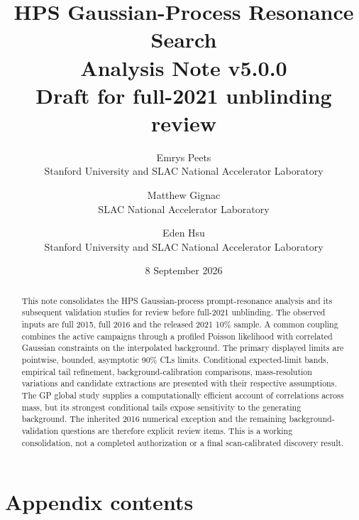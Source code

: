 \documentclass[11pt]{article}
\title{HPS Gaussian-Process Resonance Search\\[0.5em]
\large Analysis Note v5.0.0\\Draft for full-2021 unblinding review}
\author{Emrys Peets\\Stanford University and SLAC National Accelerator Laboratory
\and Matthew Gignac\\SLAC National Accelerator Laboratory
\and Eden Hsu\\Stanford University and SLAC National Accelerator Laboratory}
\date{8 September 2026}
\makeatletter
\def\CLs{CLs}%
\newcommand{\CLs}{CL$_\mathrm{s}$}
\newcommand{\startappendixcontents}{%
\let\vfiveoriginaladdcontentsline\addcontentsline
\renewcommand{\addcontentsline}[3]{%
\vfiveoriginaladdcontentsline{##1}{##2}{##3}%
\def\vfivefirst{##1}\def\vfivetoc{toc}%
\ifx\vfivefirst\vfivetoc\vfiveoriginaladdcontentsline{apc}{##2}{##3}\fi}}
\newcommand{\appendixcontents}{\section*{Appendix contents}{\setcounter{tocdepth}{2}\@starttoc{apc}}}
\makeatother
\begin{document}
\maketitle
\begin{abstract}
This note consolidates the HPS Gaussian-process prompt-resonance analysis and
its subsequent validation studies for review before full-2021 unblinding.
The observed inputs are full 2015, full 2016 and the released 2021 10\% sample.
A common coupling combines the active campaigns through a profiled Poisson
likelihood with correlated Gaussian constraints on the interpolated background.
The primary displayed limits are pointwise, bounded, asymptotic 90\% \CLs{}
limits. Conditional expected-limit bands, empirical tail refinement,
background-calibration comparisons, mass-resolution variations and candidate
extractions are presented with their respective assumptions. The GP global
study supplies a computationally efficient account of correlations across
mass, but its strongest conditional tails expose sensitivity to the generating
background. The inherited 2016 numerical exception and the remaining
background-validation questions are therefore explicit review items.
This is a working consolidation, not a completed authorization or a final
scan-calibrated discovery result.
\end{abstract}
\clearpage{\small\tableofcontents}
\clearpage

\FloatBarrier\clearpage

\FloatBarrier\clearpage

\FloatBarrier\clearpage



\FloatBarrier\clearpage

\FloatBarrier\clearpage


\FloatBarrier\clearpage

\FloatBarrier\clearpage
\appendix
{}
\startappendixcontents

\FloatBarrier\clearpage
\appendixcontents
\clearpage

\FloatBarrier\clearpage

\FloatBarrier\clearpage

\FloatBarrier\clearpage

\FloatBarrier\clearpage

\FloatBarrier\clearpage
\let\addcontentsline\vfiveoriginaladdcontentsline


\end{document}
